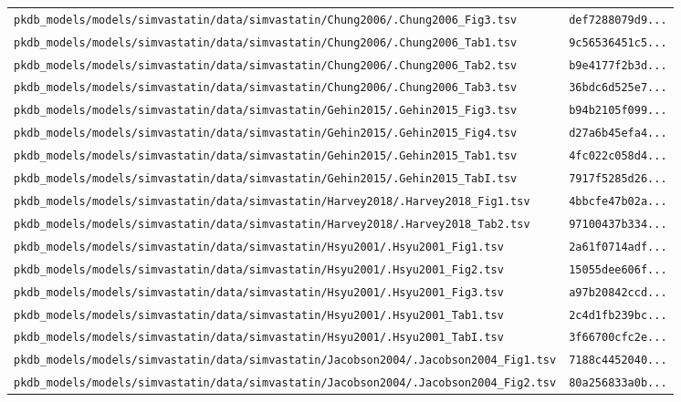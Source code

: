 \begin{longtable}{ll}
\texttt{pkdb\_models/models/simvastatin/data/simvastatin/Chung2006/.Chung2006\_Fig3.tsv} & \texttt{def7288079d9...} \\
\texttt{pkdb\_models/models/simvastatin/data/simvastatin/Chung2006/.Chung2006\_Tab1.tsv} & \texttt{9c56536451c5...} \\
\texttt{pkdb\_models/models/simvastatin/data/simvastatin/Chung2006/.Chung2006\_Tab2.tsv} & \texttt{b9e4177f2b3d...} \\
\texttt{pkdb\_models/models/simvastatin/data/simvastatin/Chung2006/.Chung2006\_Tab3.tsv} & \texttt{36bdc6d525e7...} \\
\texttt{pkdb\_models/models/simvastatin/data/simvastatin/Gehin2015/.Gehin2015\_Fig3.tsv} & \texttt{b94b2105f099...} \\
\texttt{pkdb\_models/models/simvastatin/data/simvastatin/Gehin2015/.Gehin2015\_Fig4.tsv} & \texttt{d27a6b45efa4...} \\
\texttt{pkdb\_models/models/simvastatin/data/simvastatin/Gehin2015/.Gehin2015\_Tab1.tsv} & \texttt{4fc022c058d4...} \\
\texttt{pkdb\_models/models/simvastatin/data/simvastatin/Gehin2015/.Gehin2015\_TabI.tsv} & \texttt{7917f5285d26...} \\
\texttt{pkdb\_models/models/simvastatin/data/simvastatin/Harvey2018/.Harvey2018\_Fig1.tsv} & \texttt{4bbcfe47b02a...} \\
\texttt{pkdb\_models/models/simvastatin/data/simvastatin/Harvey2018/.Harvey2018\_Tab2.tsv} & \texttt{97100437b334...} \\
\texttt{pkdb\_models/models/simvastatin/data/simvastatin/Hsyu2001/.Hsyu2001\_Fig1.tsv} & \texttt{2a61f0714adf...} \\
\texttt{pkdb\_models/models/simvastatin/data/simvastatin/Hsyu2001/.Hsyu2001\_Fig2.tsv} & \texttt{15055dee606f...} \\
\texttt{pkdb\_models/models/simvastatin/data/simvastatin/Hsyu2001/.Hsyu2001\_Fig3.tsv} & \texttt{a97b20842ccd...} \\
\texttt{pkdb\_models/models/simvastatin/data/simvastatin/Hsyu2001/.Hsyu2001\_Tab1.tsv} & \texttt{2c4d1fb239bc...} \\
\texttt{pkdb\_models/models/simvastatin/data/simvastatin/Hsyu2001/.Hsyu2001\_TabI.tsv} & \texttt{3f66700cfc2e...} \\
\texttt{pkdb\_models/models/simvastatin/data/simvastatin/Jacobson2004/.Jacobson2004\_Fig1.tsv} & \texttt{7188c4452040...} \\
\texttt{pkdb\_models/models/simvastatin/data/simvastatin/Jacobson2004/.Jacobson2004\_Fig2.tsv} & \texttt{80a256833a0b...} \\

\end{longtable}
